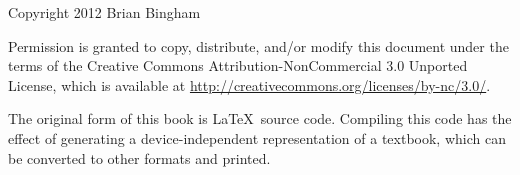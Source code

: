 \documentclass[11pt]{book}
\newcommand{\thisgls}{temp}  %
\begin{document}
\maketitle
\vspace{2in} %
 
\begin{center}
{\Large \thetitle}
\vspace{0.5in}

Copyright 2012 Brian Bingham
\end{center}

Permission is granted to copy, distribute, and/or modify this document
under the terms of the Creative Commons Attribution-NonCommercial 3.0 Unported
License, which is available at \url{http://creativecommons.org/licenses/by-nc/3.0/}.

The original form of this book is \LaTeX\ source code.  Compiling this
code has the effect of generating a device-independent representation
of a textbook, which can be converted to other formats and printed.




\setcounter{tocdepth}{1}
\tableofcontents

\mainmatter

\renewcommand{\thisgls}{dataacq}


\printglossary[type=\thisgls]
\glsresetall

\renewcommand{\thisgls}{model1}


\printglossary[type=\thisgls]
\glsresetall

\renewcommand{\thisgls}{measure}


\printglossary[type=\thisgls]
\glsresetall

\renewcommand{\thisgls}{compare}


\printglossary[type=\thisgls]
\glsresetall

\renewcommand{\thisgls}{strain}


\printglossary[type=\thisgls]
\glsresetall

\renewcommand{\thisgls}{linear}


\printglossary[type=\thisgls]
\glsresetall

\renewcommand{\thisgls}{model2}


\printglossary[type=\thisgls]
\glsresetall








\end{document}
